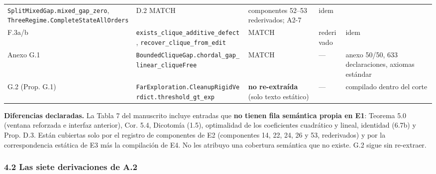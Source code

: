 \documentclass[
]{article}
\begin{document}
{\begin{longtable}[]{@{}lllll@{}}
\texttt{SplitMixedGap.mixed\_gap\_zero},
\texttt{ThreeRegime.CompleteStateAllOrders} & D.2 MATCH & componentes
52--53 rederivados; A2-7 & idem \\
F.3a/b & \texttt{exists\_clique\_additive\_defect},
\texttt{recover\_clique\_from\_edit} & MATCH & rederivado & idem \\
Anexo G.1 & \texttt{BoundedCliqueGap.chordal\_gap\_linear\_cliqueFree} &
MATCH & --- & anexo 50/50, 633 declaraciones, axiomas estándar \\
G.2 (Prop. G.1) &
\texttt{FarExploration.CleanupRigidVerdict.threshold\_gt\_exp} &
\textbf{no re-extraída} (solo texto estático) & --- & compilado dentro
del corte \\
\end{longtable}
}

\textbf{Diferencias declaradas.} La Tabla 7 del manuscrito incluye
entradas que \textbf{no tienen fila semántica propia en E1}: Teorema 5.0
(ventana reforzada e interfaz anterior), Cor. 5.4, Dicotomía (1.5),
optimalidad de los coeficientes cuadrático y lineal, identidad (6.7b) y
Prop. D.3. Están cubiertas solo por el registro de componentes de E2
(componentes 14, 22, 24, 26 y 53, rederivados) y por la correspondencia
estática de E3 más la compilación de E4. No les atribuyo una cobertura
semántica que no existe. G.2 sigue sin re-extraer.

\subsubsection{4.2 Las siete derivaciones de
A.2}\label{42-las-siete-derivaciones-de-a2}
\end{document}
